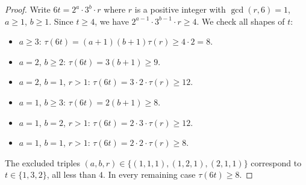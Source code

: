 \documentclass[11pt]{article}
\begin{document}
\begin{proof}
Write $6t = 2^a \cdot 3^b \cdot r$ where $r$ is a positive integer
with $\gcd(r, 6) = 1$, $a \ge 1$, $b \ge 1$.  Since $t \ge 4$,
we have $2^{a-1} \cdot 3^{b-1} \cdot r \ge 4$.  We check all shapes of $t$:
\begin{itemize}
  \item $a \ge 3$: $\tau(6t) = (a+1)(b+1)\tau(r) \ge 4 \cdot 2 = 8$.
  \item $a = 2$, $b \ge 2$: $\tau(6t) = 3(b+1) \ge 9$.
  \item $a = 2$, $b = 1$, $r > 1$: $\tau(6t) = 3 \cdot 2 \cdot \tau(r) \ge 12$.
  \item $a = 1$, $b \ge 3$: $\tau(6t) = 2(b+1) \ge 8$.
  \item $a = 1$, $b = 2$, $r > 1$: $\tau(6t) = 2 \cdot 3 \cdot \tau(r) \ge 12$.
  \item $a = 1$, $b = 1$, $r > 1$: $\tau(6t) = 2 \cdot 2 \cdot \tau(r) \ge 8$.
\end{itemize}
The excluded triples $(a,b,r) \in \{(1,1,1),(1,2,1),(2,1,1)\}$
correspond to $t \in \{1,3,2\}$, all less than $4$.
In every remaining case $\tau(6t) \ge 8$.
\end{proof}
\end{document}
